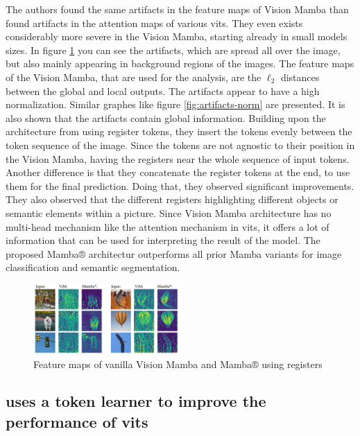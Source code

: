 \documentclass[conference]{IEEEtran}
\begin{document}
  The authors found the same artifacts in the feature maps of Vision Mamba than \citeauthor{registers} found artifacts in the attention maps of various \acp{vit}. They even exists considerably more severe in the Vision Mamba, starting already in small models sizes. In figure \ref{fig:mamba-artifacts} you can see the artifacts, which are spread all over the image, but also mainly appearing in background regions of the images. The feature maps of the Vision Mamba, that are used for the analysis, are the $\ell_2$ distances between the global and local outputs. The artifacts appear to have a high normalization. Similar graphes like figure \ref{fig:artifacts-norm} are presented. It is also shown that the artifacts contain global information. Building upon the architecture from \cite{registers} using register tokens, they insert the tokens evenly between the token sequence of the image. Since the tokens are not agnostic to their position in the Vision Mamba, having the registers near the whole sequence of input tokens. Another difference is that they concatenate the register tokens at the end, to use them for the final prediction. Doing that, they observed significant improvements. They also observed that the different registers highlighting different objects or semantic elements within a picture. Since Vision Mamba architecture has no multi-head mechanism like the attention mechanism in \acp{vit}, it offers a lot of information that can be used for interpreting the result of the model. The proposed Mamba® architectur outperforms all prior Mamba variants for image classification and semantic segmentation. \cite{mamba-needs-registers}

  \begin{figure}
    \centering
    \includegraphics[width=0.5\textwidth]{figures/mamba-artifacts.png}
    \caption{Feature maps of vanilla Vision Mamba \cite{vision-mamba} and Mamba® using registers \cite{mamba-needs-registers}}
    \label{fig:mamba-artifacts}
  \end{figure}

  \subsection{\cite{sum-tokens-to-registers} uses a token learner to improve the performance of \ac{vit}s}
\end{document}
